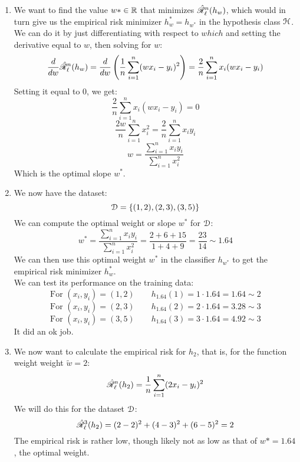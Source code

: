 \documentclass[12pt]{article}
\begin{document}
\begin{enumerate}[label = \letters]
\item 
We want to find the value $w* \in \mathbb{R}$
that minimizes $\hat{\mathscr{R}}_\ell^n(h_w)$,
which would in turn give us the
empirical risk minimizer $h_w^* = h_{w^*}$
in the hypothesis class $\mathcal{H}$. \\
We can do it by just differentiating
with respect to $which$ and setting the derivative
equal to $w$,
then solving for $w$:
\[ \dfrac{d}{dw}\hat{\mathscr{R}}_\ell^n(h_w)
= \dfrac{d}{dw}\left( \dfrac{1}{n}\sum_{i = 1}^{n}
(wx_i - y_i)^2 \right) 
= \dfrac{2}{n}\sum_{i = 1}^{n}x_i(wx_i - y_i) \]
Setting it equal to $0$, we get:
\[ \dfrac{2}{n}\sum_{i = 1}^{n}x_i(wx_i - y_i) = 0 \]
\[ \dfrac{2w}{n}\sum_{i = 1}^{n}x_i^2 
= \dfrac{2}{n}\sum_{i = 1}^{n} x_iy_i \]
\[ w = \dfrac{\sum_{i = 1}^{n}x_iy_i}
{\sum_{i = 1}^{n} x_i^2} \]
Which is the optimal slope $w^*$.
\item
We now have the dataset:
\[ \mathcal{D} = \{ (1, 2), (2, 3), (3, 5)\} \]
We can compute the optimal weight or slope $w^*$
for $\mathcal{D}$:
\[ w^* = \dfrac{\sum_{i = 1}^{n}x_iy_i}
{\sum_{i = 1}^{n} x_i^2}
= \dfrac{2 + 6 + 15}
{1 + 4 + 9} = \dfrac{23}{14} \sim 1.64 \]
We can then use this optimal weight $w^*$
in the classifier $h_{w^*}$
to get the empirical risk minimizer $h_w^*$. \\
We can test its performance on the training
data:
\[ \text{For } (x_i, y_i) = (1, 2) \qquad
h_{1.64}(1) = 1 \cdot 1.64 = 1.64 \sim 2 \]
\[ \text{For } (x_i, y_i) = (2, 3) \qquad
h_{1.64}(2) = 2 \cdot 1.64 = 3.28  \sim 3 \]
\[ \text{For } (x_i, y_i) = (3, 5) \qquad
h_{1.64}(3) = 3 \cdot 1.64 = 4.92  \sim 3 \]
It did an ok job.
\item
We now want to calculate the empirical
risk for $h_{2}$,
that is, for the function weight weight 
$\tilde{w} = 2$:
\[ \hat{\mathscr{R}}_\ell^n(h_2)
= \dfrac{1}{n}\sum_{i = 1}^{n}(2x_i - y_i)^2 \]
We will do this for the dataset $\mathcal{D}$:
\[ \hat{\mathscr{R}}_\ell^3(h_2)
= (2-2)^2 + (4-3)^2 + (6-5)^2 = 2 \]
The empirical risk is rather low,
though likely not as low as that of $w* = 1.64$,
the optimal weight. \\
\end{enumerate}
\end{document}
